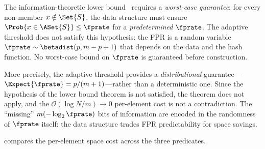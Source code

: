 \begin{remark}
\label{rem:lb_not_violated}
The information-theoretic lower bound~\cite{carter1978} requires a
\emph{worst-case guarantee}: for every non-member $x \notin \Set{S}$, the data
structure must ensure $\Prob{x \in \ASet{S}} \leq \fprate$ for a
\emph{predetermined} $\fprate$.
The adaptive threshold does not satisfy this hypothesis: the FPR is a random
variable $\fprate \sim \betadist(p, m - p + 1)$ that depends on the data and
the hash function.
No worst-case bound on $\fprate$ is guaranteed before construction.

More precisely, the adaptive threshold provides a \emph{distributional}
guarantee---$\Expect{\fprate} = p/(m+1)$---rather than a deterministic one.
Since the hypothesis of the lower bound theorem is not satisfied, the theorem
does not apply, and the $\mathcal{O}(\log N / m) \to 0$ per-element cost is
not a contradiction.
The ``missing'' $m(-\log_2 \fprate)$ bits of information are encoded in the
randomness of $\fprate$ itself: the data structure trades FPR predictability
for space savings.
\end{remark}

 compares the per-element space cost across the
three predicates.

